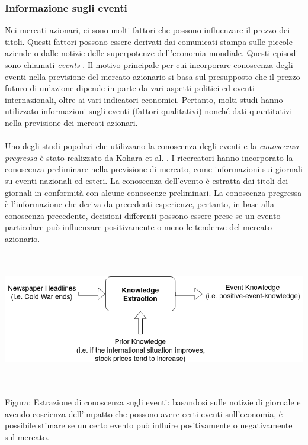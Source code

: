 \documentclass[a4paper,12pt]{report}
\begin{document}
\subsubsection{Informazione sugli eventi}
Nei mercati azionari, ci sono molti fattori che possono influenzare il prezzo dei titoli. Questi fattori possono essere derivati dai comunicati stampa sulle piccole aziende o dalle notizie delle superpotenze dell'economia mondiale. Questi episodi sono chiamati \textit{events} \cite{29}. Il motivo principale per cui incorporare conoscenza degli eventi nella previsione del mercato azionario si basa sul presupposto che il prezzo futuro di un'azione dipende in parte da vari aspetti politici ed eventi internazionali, oltre ai vari indicatori economici. Pertanto, molti studi hanno utilizzato informazioni sugli eventi (fattori qualitativi) nonché dati quantitativi nella previsione dei mercati azionari.\\~\\ Uno degli studi popolari che utilizzano la conoscenza degli eventi e la \textit{conoscenza pregressa} è stato realizzato da Kohara et al. \cite{know-nn2}. I ricercatori hanno incorporato la conoscenza preliminare nella previsione di mercato, come informazioni sui giornali su eventi nazionali ed esteri. La conoscenza dell'evento è estratta dai titoli dei giornali in conformità con alcune conoscenze preliminari. La conoscenza pregressa è l'informazione che deriva da precedenti esperienze, pertanto, in base alla conoscenza precedente, decisioni differenti possono essere prese se un evento particolare può influenzare positivamente o meno le tendenze del mercato azionario.\\~\\\\
\begin{fig}
\includegraphics[width=\linewidth]{prior_knowledge}
\caption{\\~\\Figura: Estrazione di conoscenza sugli eventi: basandosi sulle notizie di giornale e avendo coscienza dell'impatto che possono avere certi eventi sull'economia, è possibile stimare se un certo evento può influire positivamente o negativamente sul mercato.}
\end{fig}
\end{document}
